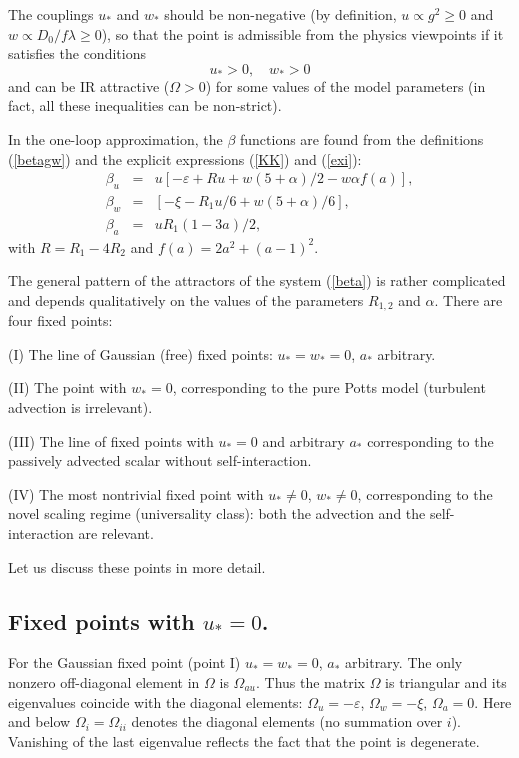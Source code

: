 \documentclass[12pt]{iopart}
\begin{document}
The couplings $u_{*}$ and $w_{*}$ should be non-negative (by definition,
$u\propto g^2 \ge 0$ and $w \propto D_0/f\lambda \ge 0$), so that
the point is admissible from the physics viewpoints if it satisfies the
conditions
\begin{equation}
u_{*} > 0, \quad w_{*} > 0
\label{posit}
\end{equation}
and can be IR attractive ($\Omega>0$) for some values of the model
parameters (in fact, all these inequalities can be non-strict).



In the one-loop approximation, the $\beta$ functions are found from the
definitions (\ref{betagw}) and the explicit expressions
(\ref{KK}) and (\ref{exi}):
\begin{eqnarray}
\beta_{u} &=& u \left[ -\varepsilon+ Ru + w(5+\alpha)/2 -w\alpha
f(a) \right],
\nonumber \\
\beta_{w} &=&  \left[ -\xi - R_1 u/6 + w(5+\alpha)/6 \right],
\nonumber \\
\beta_{a} &=& uR_1(1-3a)/2,
\label{beta}
\end{eqnarray}
with $R=R_1-4R_2$ and $f(a)=2a^{2}+(a-1)^{2}$.

The general pattern of the attractors of the system (\ref{beta}) is rather
complicated and depends qualitatively on the values of the parameters
$R_{1,2}$ and $\alpha$. There are four fixed points:

(I) The line of Gaussian (free) fixed points: $u_{*}=w_{*}=0$,
$a_{*}$ arbitrary.

(II) The point with $w_{*}=0$, corresponding to the pure Potts model
(turbulent advection is irrelevant).

(III) The line of fixed points with $u_{*}=0$ and  arbitrary $a_{*}$
corresponding to the passively advected scalar without self-interaction.

(IV) The most nontrivial fixed point with $u_{*}\ne0$, $w_{*}\ne0$,
corresponding to the novel scaling regime (universality class):
both the advection and the self-interaction are relevant.

Let us discuss these points in more detail.

\subsection{Fixed points with $u_{*}=0$.}  \label{Gauss}

For the Gaussian fixed point (point I) $u_{*}=w_{*}=0$, $a_{*}$ arbitrary.
The only nonzero off-diagonal element in $\Omega$ is $\Omega_{au}$.
Thus the matrix $\Omega$ is triangular and its eigenvalues coincide with
the diagonal elements: $\Omega_{u}=-\varepsilon$, $\Omega_{w}=-\xi$,
$\Omega_{a}=0$. Here and below $\Omega_{i} =\Omega_{ii}$ denotes the
diagonal elements (no summation over $i$). Vanishing of the last
eigenvalue reflects the fact that the point is degenerate.
\end{document}
